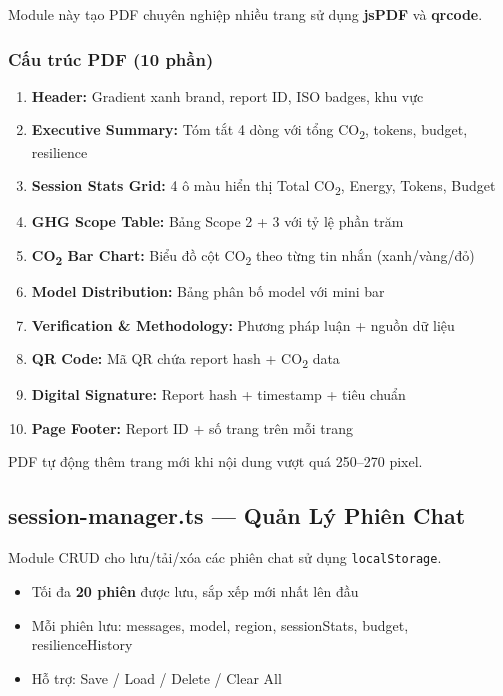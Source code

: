 \documentclass[12pt,a4paper]{article}
\begin{document}
Module này tạo PDF chuyên nghiệp nhiều trang sử dụng \textbf{jsPDF} và \textbf{qrcode}.

\subsubsection{Cấu trúc PDF (10 phần)}

\begin{enumerate}
    \item \textbf{Header:} Gradient xanh brand, report ID, ISO badges, khu vực
    \item \textbf{Executive Summary:} Tóm tắt 4 dòng với tổng CO\textsubscript{2}, tokens, budget, resilience
    \item \textbf{Session Stats Grid:} 4 ô màu hiển thị Total CO\textsubscript{2}, Energy, Tokens, Budget
    \item \textbf{GHG Scope Table:} Bảng Scope 2 + 3 với tỷ lệ phần trăm
    \item \textbf{CO\textsubscript{2} Bar Chart:} Biểu đồ cột CO\textsubscript{2} theo từng tin nhắn (xanh/vàng/đỏ)
    \item \textbf{Model Distribution:} Bảng phân bố model với mini bar
    \item \textbf{Verification \& Methodology:} Phương pháp luận + nguồn dữ liệu
    \item \textbf{QR Code:} Mã QR chứa report hash + CO\textsubscript{2} data
    \item \textbf{Digital Signature:} Report hash + timestamp + tiêu chuẩn
    \item \textbf{Page Footer:} Report ID + số trang trên mỗi trang
\end{enumerate}

PDF tự động thêm trang mới khi nội dung vượt quá 250--270 pixel.

\subsection{session-manager.ts — Quản Lý Phiên Chat}

Module CRUD cho lưu/tải/xóa các phiên chat sử dụng \texttt{localStorage}.

\begin{itemize}
    \item Tối đa \textbf{20 phiên} được lưu, sắp xếp mới nhất lên đầu
    \item Mỗi phiên lưu: messages, model, region, sessionStats, budget, resilienceHistory
    \item Hỗ trợ: Save / Load / Delete / Clear All
\end{itemize}
\end{document}
